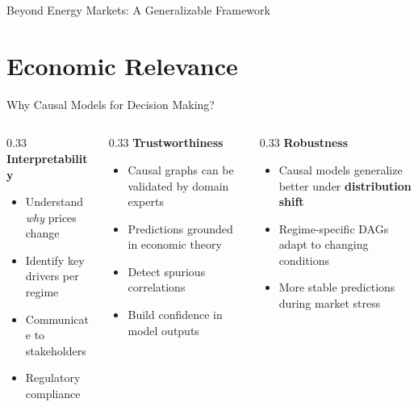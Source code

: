 \documentclass[aspectratio=169]{beamer}
\begin{document}
\begin{frame}{Beyond Energy Markets: A Generalizable Framework}
\vspace{0.3cm}
\begin{center}
\end{center}
\end{frame}

\section{Economic Relevance}

\begin{frame}{Why Causal Models for Decision Making?}
\begin{columns}
\begin{column}{0.33\textwidth}
\textbf{Interpretability}
\begin{itemize}
    \item Understand \textit{why} prices change
    \item Identify key drivers per regime
    \item Communicate to stakeholders
    \item Regulatory compliance
\end{itemize}
\end{column}

\begin{column}{0.33\textwidth}
\textbf{Trustworthiness}
\begin{itemize}
    \item Causal graphs can be validated by domain experts
    \item Predictions grounded in economic theory
    \item Detect spurious correlations
    \item Build confidence in model outputs
\end{itemize}
\end{column}

\begin{column}{0.33\textwidth}
\textbf{Robustness}
\begin{itemize}
    \item Causal models generalize better under \textbf{distribution shift}
    \item Regime-specific DAGs adapt to changing conditions
    \item More stable predictions during market stress
\end{itemize}
\end{column}
\end{columns}
\end{frame}
\end{document}

